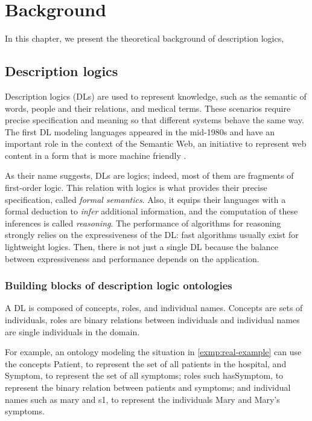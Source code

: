 
\chapter{Background}
\label{cap:background}

In this chapter, we present the theoretical background of description logics,


\section{Description logics}
Description logics (DLs) are used to represent knowledge, such as the semantic of words,  people and their relations, and medical terms. These scenarios require precise specification and meaning so that different systems behave the same way. The first DL modeling languages appeared in the mid-1980s and have an important role in the context of the Semantic Web, an initiative to represent web content in a form that is more machine friendly \citep{krotzsch2012description}.

As their name suggests, DLs are logics; indeed, most of them are fragments of first-order logic. This relation with logics is what provides their precise specification, called \emph{formal semantics}. Also, it equips their languages with a formal deduction to \emph{infer} additional information, and the computation of these inferences is called \emph{reasoning}. The performance of algorithms for reasoning strongly relies on the expressiveness of the DL: fast algorithms usually exist for lightweight logics. Then, there is not just a single DL because the balance between expressiveness and performance depends on the application. \citep{krotzsch2012description}

\subsection{Building blocks of description logic ontologies}
A DL is composed of concepts, roles, and individual names. Concepts are sets of individuals, roles are binary relations between individuals and individual names are single individuals in the domain.

For example, an ontology modeling the situation in \autoref{exmp:real-example} can use the concepts \textsf{Patient}, to represent the set of all patients in the hospital, and \textsf{Symptom}, to represent the set of all symptoms; roles such \textsf{hasSymptom}, to represent the binary relation between patients and symptoms; and individual names such as \textsf{mary} and \textsf{s1}, to represent the individuals Mary and Mary's symptoms.

